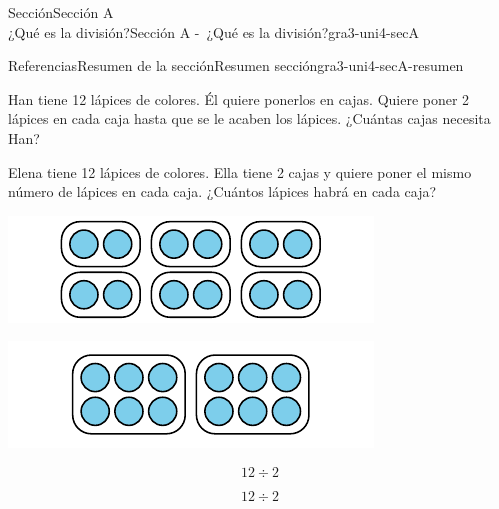 \begin{sectionptx}{Sección}{{\Large Sección A\\}¿Qué es la división?}{}{Sección A -~¿Qué es la división?}{}{}{gra3-uni4-secA}
\begin{references-subsection}{Referencias}{Resumen de la sección}{}{Resumen sección}{}{}{gra3-uni4-secA-resumen}
\begin{sidebyside}{2}{0.025}{0.025}{0.05}
\begin{sbspanel}{0.45}%
Han tiene 12 lápices de colores. Él quiere ponerlos en cajas. Quiere poner 2 lápices en cada caja hasta que se le acaben los lápices. ¿Cuántas cajas necesita Han?%
\end{sbspanel}%
\begin{sbspanel}{0.45}%
\par
Elena tiene 12 lápices de colores. Ella tiene 2 cajas y quiere poner el mismo número de lápices en cada caja. ¿Cuántos lápices habrá en cada caja?%
\end{sbspanel}%
\end{sidebyside}%
\begin{sidebyside}{2}{0.025}{0.025}{0.05}%
\begin{sbspanel}{0.45}%
\includegraphics[max width=\linewidth, center]{external/svg-source/tikz-file-147695.pdf}
\end{sbspanel}%
\begin{sbspanel}{0.45}%
\includegraphics[max width=\linewidth, center]{external/svg-source/tikz-file-147696.pdf}
\end{sbspanel}%
\end{sidebyside}%
\begin{sidebyside}{2}{0.025}{0.025}{0.05}%
\begin{sbspanel}{0.45}%
%
\begin{equation*}
12 \div 2
\end{equation*}
%
\end{sbspanel}%
\begin{sbspanel}{0.45}%
\par
%
\begin{equation*}
12 \div 2
\end{equation*}
%
\end{sbspanel}%
\end{sidebyside}%
\end{references-subsection}
\end{sectionptx}
